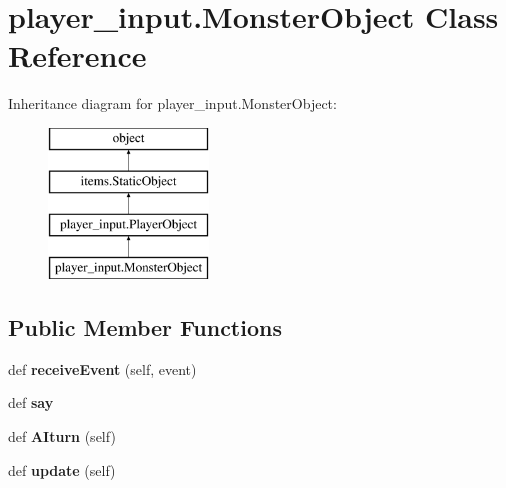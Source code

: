 \hypertarget{classplayer__input_1_1_monster_object}{}\section{player\+\_\+input.\+Monster\+Object Class Reference}
\label{classplayer__input_1_1_monster_object}
Inheritance diagram for player\+\_\+input.\+Monster\+Object\+:\begin{figure}[H]
\begin{center}
\leavevmode
\includegraphics[height=4.000000cm]{classplayer__input_1_1_monster_object}
\end{center}
\end{figure}
\subsection*{Public Member Functions}
\begin{DoxyCompactItemize}
\item 
\hypertarget{classplayer__input_1_1_monster_object_a802f9d2840f4b807f2003a5d0bc9f37f}{}def {\bfseries receive\+Event} (self, event)\label{classplayer__input_1_1_monster_object_a802f9d2840f4b807f2003a5d0bc9f37f}

\item 
\hypertarget{classplayer__input_1_1_monster_object_a0c1721ce47422a4352cc8eaff6eeb9f1}{}def {\bfseries say}\label{classplayer__input_1_1_monster_object_a0c1721ce47422a4352cc8eaff6eeb9f1}

\item 
\hypertarget{classplayer__input_1_1_monster_object_a712aed80122c39d97f34cf12f03c0eaf}{}def {\bfseries A\+Iturn} (self)\label{classplayer__input_1_1_monster_object_a712aed80122c39d97f34cf12f03c0eaf}

\item 
\hypertarget{classplayer__input_1_1_monster_object_a3296a098c92aa0b96e4da86600bee5b0}{}def {\bfseries update} (self)\label{classplayer__input_1_1_monster_object_a3296a098c92aa0b96e4da86600bee5b0}

\end{DoxyCompactItemize}
